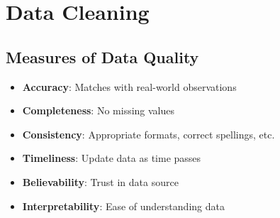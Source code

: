 \documentclass{article}
\theoremstyle{plain}
\theoremstyle{definition}
\begin{document}
\section{Data Cleaning}

\subsection{Measures of Data Quality}
\begin{itemize}
    \item \textbf{Accuracy}: Matches with real-world observations
    
    \item \textbf{Completeness}: No missing values
    
    \item \textbf{Consistency}: Appropriate formats, correct spellings, etc.
    
    \item \textbf{Timeliness}: Update data as time passes
    
    \item \textbf{Believability}: Trust in data source
    
    \item \textbf{Interpretability}: Ease of understanding data
\end{itemize}
\end{document}
